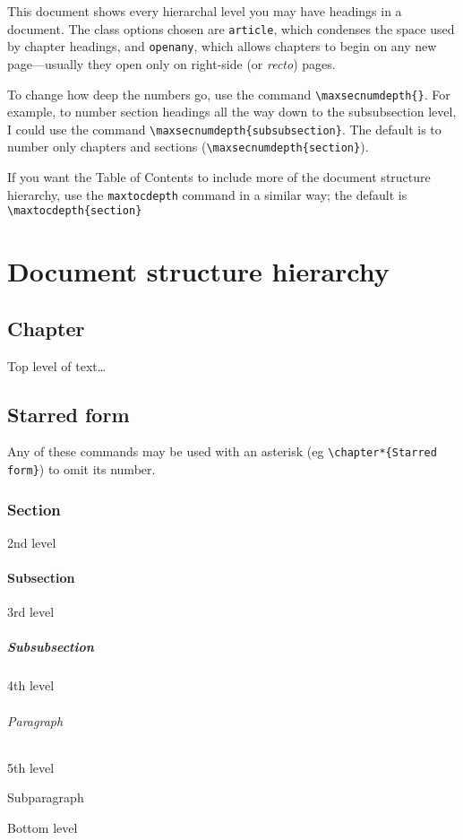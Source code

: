 \documentclass[article,openany]{memoir}
\begin{document}
This document shows every hierarchal level you may have headings in a document. The class options chosen are \texttt{article}, which condenses the space used by chapter headings, and \texttt{openany}, which allows chapters to begin on any new page---usually they open only on right-side (or \emph{recto}) pages.

To change how deep the numbers go, use the command \verb|\maxsecnumdepth{}|. For example, to number section headings all the way down to the subsubsection level, I could use the command \verb|\maxsecnumdepth{subsubsection}|. The default is to number only chapters and sections (\verb|\maxsecnumdepth{section}|).

If you want the Table of Contents to include more of the document structure hierarchy, use the \texttt{maxtocdepth} command in a similar way; the default is \verb|\maxtocdepth{section}|

\part{Document structure hierarchy}

\chapter{Chapter}

Top level of text\dots

\chapter*{Starred form}

Any of these commands may be used with an asterisk (eg \verb|\chapter*{Starred form}|) to omit its number.

\section{Section}

2nd level

\subsection{Subsection}

3rd level

\subsubsection{Subsubsection}

4th level

\paragraph{Paragraph}
5th level
\subparagraph{Subparagraph}
Bottom level
\end{document}
